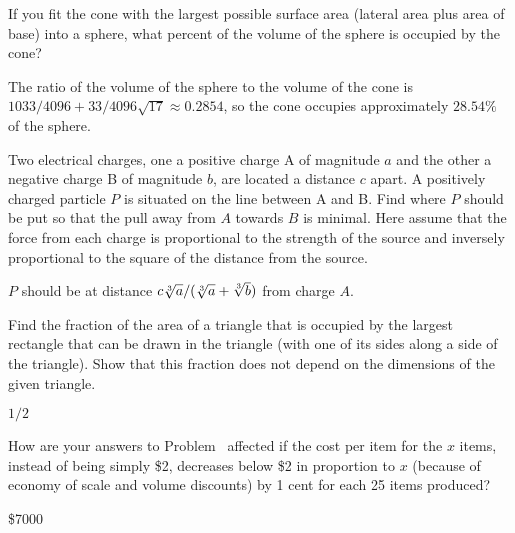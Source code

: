 \begin{exercises}
\begin{exercise}
If you fit the cone with the largest possible surface area (lateral area
plus area of base) into a sphere, what percent of the volume of the
sphere is occupied by the cone?  
\begin{answer} The ratio of the volume of the sphere to the volume of the
cone is $1033/4096+33/4096\sqrt{17}\approx 0.2854$, so the cone
occupies approximately $28.54\%$ of the sphere.
\end{answer}\end{exercise}

\begin{exercise}
Two electrical charges, one a positive charge A of magnitude $a$ and the
other a negative charge B of magnitude $b$, are located a distance $c$
apart.  A positively charged particle $P$ is situated on the line between A
and B.  Find where $P$ should be put so that the pull away from $A$ towards
$B$ is minimal.  Here assume that the force from each charge is
proportional to the strength of the source and inversely proportional to
the square of the distance from the source.
\begin{answer} $P$ should be at distance $c\root 3\of {a} /
(\root 3\of {a} + \root 3\of {b})$ from charge $A$.
\end{answer}\end{exercise}

\begin{exercise}
Find the fraction of the area of a triangle that is occupied by the largest
rectangle that can be drawn in the triangle (with one of its sides along a
side of the triangle).  Show that this fraction does not depend on the
dimensions of the given triangle.
\begin{answer} $1/2$
\end{answer}\end{exercise}

\begin{exercise}
How are your answers to Problem~
 affected if the cost per item for the $x$
items, instead of being simply \$2, decreases below \$2 in proportion to
$x$ (because of economy of scale and volume discounts) by 1 cent for each
25 items produced?
\begin{answer} \$7000
\end{answer}\end{exercise}


\end{exercises}
